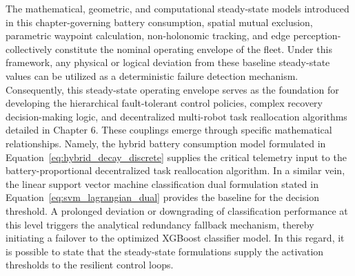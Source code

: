 The mathematical, geometric, and computational steady-state models introduced in this chapter-governing battery consumption, spatial mutual exclusion, parametric waypoint calculation, non-holonomic tracking, and edge perception-collectively constitute the nominal operating envelope of the fleet. Under this framework, any physical or logical deviation from these baseline steady-state values can be utilized as a deterministic failure detection mechanism. Consequently, this steady-state operating envelope serves as the foundation for developing the hierarchical fault-tolerant control policies, complex recovery decision-making logic, and decentralized multi-robot task reallocation algorithms detailed in Chapter 6. These couplings emerge through specific mathematical relationships. Namely, the hybrid battery consumption model formulated in Equation~\ref{eq:hybrid_decay_discrete} supplies the critical telemetry input to the battery-proportional decentralized task reallocation algorithm. In a similar vein, the linear support vector machine classification dual formulation stated in Equation~\ref{eq:svm_lagrangian_dual} provides the baseline for the decision threshold. A prolonged deviation or downgrading of classification performance at this level triggers the analytical redundancy fallback mechanism, thereby initiating a failover to the optimized XGBoost classifier model. In this regard, it is possible to state that the steady-state formulations supply the activation thresholds to the resilient control loops.